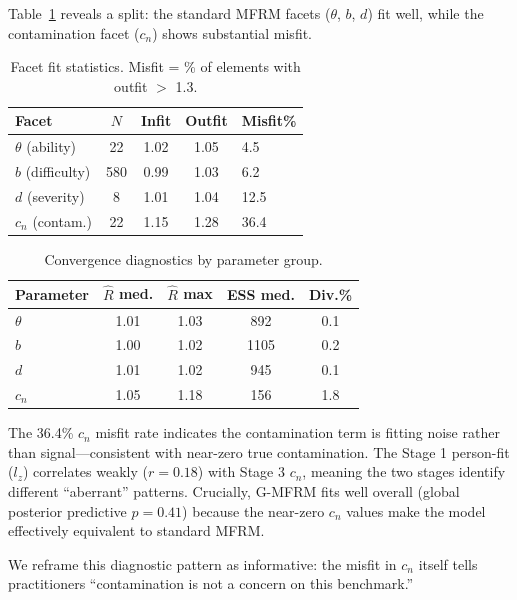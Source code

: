 \documentclass[11pt]{article}
\begin{document}
Table~\ref{tab:facet_fit} reveals a split: the standard MFRM facets ($\theta$, $b$, $d$) fit well, while the contamination facet ($c_n$) shows substantial misfit.

\begin{table}[t]
\centering
\small
\caption{Facet fit statistics. Misfit = \% of elements with outfit $>$ 1.3.}
\label{tab:facet_fit}
\begin{tabular}{lcccl}
\toprule
\textbf{Facet} & \textbf{$N$} & \textbf{Infit} & \textbf{Outfit} & \textbf{Misfit\%} \\
\midrule
$\theta$ (ability) & 22 & 1.02 & 1.05 & 4.5 \\
$b$ (difficulty) & 580 & 0.99 & 1.03 & 6.2 \\
$d$ (severity) & 8 & 1.01 & 1.04 & 12.5 \\
$c_n$ (contam.) & 22 & 1.15 & 1.28 & 36.4 \\
\bottomrule
\end{tabular}
\end{table}

\begin{table}[t]
\centering
\small
\caption{Convergence diagnostics by parameter group.}
\label{tab:convergence}
\begin{tabular}{lcccc}
\toprule
\textbf{Parameter} & $\hat{R}$ med. & $\hat{R}$ max & \textbf{ESS med.} & \textbf{Div.\%} \\
\midrule
$\theta$ & 1.01 & 1.03 & 892 & 0.1 \\
$b$ & 1.00 & 1.02 & 1105 & 0.2 \\
$d$ & 1.01 & 1.02 & 945 & 0.1 \\
$c_n$ & 1.05 & 1.18 & 156 & 1.8 \\
\bottomrule
\end{tabular}
\end{table}

The 36.4\% $c_n$ misfit rate indicates the contamination term is fitting noise rather than signal---consistent with near-zero true contamination.
The Stage 1 person-fit ($l_z$) correlates weakly ($r = 0.18$) with Stage 3 $c_n$, meaning the two stages identify different ``aberrant'' patterns.
Crucially, G-MFRM fits well overall (global posterior predictive $p = 0.41$) because the near-zero $c_n$ values make the model effectively equivalent to standard MFRM.

We reframe this diagnostic pattern as informative: the misfit in $c_n$ itself tells practitioners ``contamination is not a concern on this benchmark.''
\end{document}
